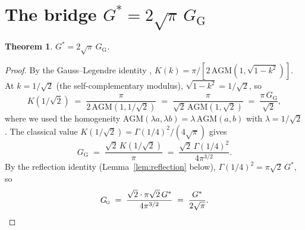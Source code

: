 \documentclass[11pt]{article}
\newtheorem{theorem}{Theorem}[section]
\theoremstyle{definition}
\theoremstyle{remark}
\newcommand{\Gs}{G^{*}}
\newcommand{\GG}{G_{\!\scriptscriptstyle\mathrm{G}}}
\newcommand{\AGM}{\mathrm{AGM}}
\begin{document}
\section{The bridge $\Gs = 2\sqrt{\pi}\,\GG$}\label{sec:bridge}

\begin{theorem}\label{thm:bridge}
$\Gs = 2\sqrt{\pi}\,\GG$.
\end{theorem}

\begin{proof}
By the Gauss--Legendre identity \cite[Thm.~1.1]{borweinAGM},
$K(k) = \pi/[2\,\AGM(1, \sqrt{1-k^2})]$. At $k = 1/\sqrt 2$ (the self-complementary
modulus), $\sqrt{1-k^2} = 1/\sqrt 2$, so
\[
K(1/\sqrt 2) \;=\; \frac{\pi}{2\,\AGM(1, 1/\sqrt 2)} \;=\; \frac{\pi}{\sqrt 2\,\AGM(1, \sqrt 2)} \;=\; \frac{\pi\,\GG}{\sqrt 2},
\]
where we used the homogeneity $\AGM(\lambda a, \lambda b) = \lambda\,\AGM(a,b)$
with $\lambda = 1/\sqrt 2$. The classical value
$K(1/\sqrt 2) = \Gamma(1/4)^2/(4\sqrt\pi)$ \cite[Eq.~2.5.4]{borweinAGM} gives
\[
\GG \;=\; \frac{\sqrt 2\,K(1/\sqrt 2)}{\pi} \;=\; \frac{\sqrt 2\,\Gamma(1/4)^2}{4\pi^{3/2}}.
\]
By the reflection identity (Lemma~\ref{lem:reflection} below),
$\Gamma(1/4)^2 = \pi\sqrt 2\,\Gs$, so
\[
\GG \;=\; \frac{\sqrt 2 \cdot \pi\sqrt 2\,\Gs}{4\pi^{3/2}} \;=\; \frac{\Gs}{2\sqrt\pi}. \qedhere
\]
\end{proof}
\end{document}
